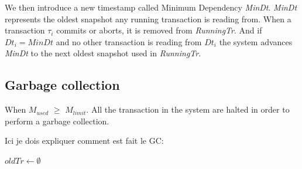 \documentclass[systeme]{compas2022}
\begin{document}
We then introduce a new timestamp called Minimum Dependency \emph{MinDt}.
\emph{MinDt} represents the oldest snapshot any running transaction is reading from.
When a transaction $\tau_i$ commits or aborts, it is removed from \emph{RunningTr}. 
And if $Dt_i = MinDt$ and no other transaction is reading from $Dt_i$ the system advances \emph{MinDt} to the next oldest snapshot used in \emph{RunningTr}.


\subsection{Garbage collection}
When \emph{$M_{used}$} $\geq$ \emph{$M_{limit}$}. 
All the transaction in the system are halted in order to perform a garbage collection.

Ici je dois expliquer comment est fait le GC:\\
\begin{algorithm}
  \(oldTr \longleftarrow \emptyset\)\;
\end{algorithm}


\end{document}
